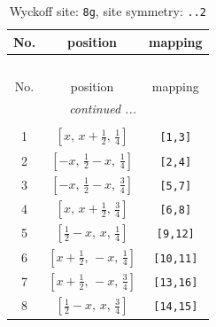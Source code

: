\documentclass[fleqn,8pt]{jsarticle}
\begin{document}
\renewcommand{\arraystretch}{1.2}
\begin{longtable}{ccc}
\caption{Wyckoff site: {\tt 8g}, site symmetry: {\tt ..2}}
 \\
 \hline \hline
No. & position & mapping \\ \hline \endfirsthead

\multicolumn{2}{l}{\tablename\ \thetable{}} \\
 \hline \hline
No. & position & mapping \\ \hline \endhead

 \hline \hline
\multicolumn{2}{r}{\footnotesize\it continued ...} \\ \endfoot

 \hline \hline
\multicolumn{2}{r}{} \\ \endlastfoot

1 & $\left[ x,\, x + \frac{1}{2},\, \frac{1}{4} \right]$ & {\tt [1,3]} \\ \hline
2 & $\left[ - x,\, \frac{1}{2} - x,\, \frac{1}{4} \right]$ & {\tt [2,4]} \\ \hline
3 & $\left[ - x,\, \frac{1}{2} - x,\, \frac{3}{4} \right]$ & {\tt [5,7]} \\ \hline
4 & $\left[ x,\, x + \frac{1}{2},\, \frac{3}{4} \right]$ & {\tt [6,8]} \\ \hline
5 & $\left[ \frac{1}{2} - x,\, x,\, \frac{1}{4} \right]$ & {\tt [9,12]} \\ \hline
6 & $\left[ x + \frac{1}{2},\, - x,\, \frac{1}{4} \right]$ & {\tt [10,11]} \\ \hline
7 & $\left[ x + \frac{1}{2},\, - x,\, \frac{3}{4} \right]$ & {\tt [13,16]} \\ \hline
8 & $\left[ \frac{1}{2} - x,\, x,\, \frac{3}{4} \right]$ & {\tt [14,15]} \\
\end{longtable}
\renewcommand{\arraystretch}{1.2}
\end{document}

